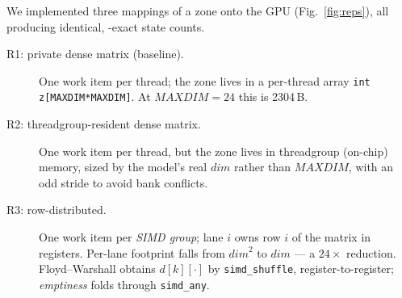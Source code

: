 We implemented three mappings of a zone onto the GPU (Fig.~\ref{fig:reps}), all producing
identical, \uppaal{}-exact state counts.

\begin{description}
\item[R1: private dense matrix (baseline).] One work item per thread; the zone lives in a
per-thread array \texttt{int z[MAXDIM*MAXDIM]}. At $\mathit{MAXDIM}=24$ this is 2304\,B.
\item[R2: threadgroup-resident dense matrix.] One work item per thread, but the zone lives in
threadgroup (on-chip) memory, sized by the model's real $\mathit{dim}$ rather than
$\mathit{MAXDIM}$, with an odd stride to avoid bank conflicts.
\item[R3: row-distributed.] One work item per \emph{SIMD group}; lane $i$ owns row $i$ of the
matrix in registers. Per-lane footprint falls from $\mathit{dim}^2$ to $\mathit{dim}$ --- a
$24\times$ reduction. Floyd--Warshall obtains $d[k][\cdot]$ by \texttt{simd\_shuffle},
register-to-register; \emph{emptiness} folds through \texttt{simd\_any}.
\end{description}

